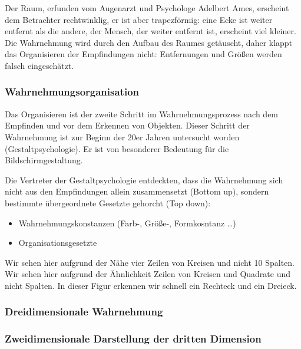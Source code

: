  
Der Raum, erfunden vom Augenarzt und Psychologe Adelbert Ames, erscheint dem Betrachter rechtwinklig, er ist aber trapezförmig: eine Ecke ist weiter entfernt als die andere, der Mensch, der weiter entfernt ist, erscheint viel kleiner. Die Wahrnehmung wird durch den Aufbau des Raumes getäuscht, daher klappt das Organisieren der Empfindungen nicht: Entfernungen und Größen werden falsch eingeschätzt. 
\subsubsection{Wahrnehmungsorganisation}
Das Organisieren ist der zweite Schritt im Wahrnehmungsprozess nach dem Empfinden und vor dem Erkennen von Objekten. Dieser Schritt der Wahrnehmung ist zur Beginn der 20er Jahren untersucht worden (Gestaltpsychologie). Er ist von besonderer Bedeutung für die Bildschirmgestaltung. 
 
Die Vertreter der Gestaltpsychologie entdeckten, dass die Wahrnehmung sich nicht aus den Empfindungen allein zusammensetzt (Bottom up), sondern bestimmte übergeordnete Gesetzte gehorcht (Top down):
\begin{itemize}
\item Wahrnehmungskonstanzen (Farb-, Größe-, Formkosntanz …)
\item Organisationsgesetzte
\end{itemize}
Wir sehen hier aufgrund der Nähe vier Zeilen von Kreisen und nicht 10 Spalten.
Wir sehen hier aufgrund der Ähnlichkeit Zeilen von Kreisen und Quadrate und nicht Spalten.
In dieser Figur erkennen wir schnell ein Rechteck und ein Dreieck.

\subsubsection{Dreidimensionale Wahrnehmung}
\subsubsection*{Zweidimensionale Darstellung der dritten Dimension}
